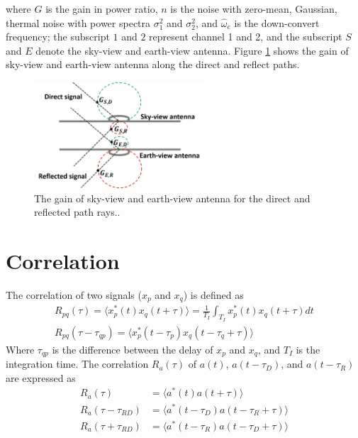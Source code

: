 \documentclass[draftcls]{IEEEtran}
\begin{document}
where $G$ is the gain in power ratio, $n$ is the noise with zero-mean, Gaussian, thermal noise with power spectra $\sigma^2_1$ and $\sigma^2_2$, and $\hat{\omega}_e$ is the down-convert frequency; the subscript $1$ and $2$ represent channel 1 and 2, and the subscript $S$ and $E$ denote the sky-view and earth-view antenna. Figure \ref{fig:ant_gain} shows the gain of sky-view and earth-view antenna along the direct and reflect paths.
\begin{figure}[t!]
	\centering
	\includegraphics[width=2.5in]{pdf/ant_gain.jpg}
	\caption{The gain of sky-view and earth-view antenna for the direct and reflected path rays..}
	\centering
	\label{fig:ant_gain}
\end{figure}

\section{Correlation}

The correlation of two signals ($x_p$ and $x_q$) is defined as
\begin{eqnarray}
	R_{pq}(\tau)  = \langle x_p^*(t)x_q(t+\tau)\rangle=\frac{1}{T_I} \int_{T_I}x_p^*(t) x_q(t+\tau)dt \\ 
    R_{pq}(\tau-\tau_{qp}) =\langle x_p^*(t-\tau_p)x_q(t-\tau_q +\tau)\rangle
    \label{Eq: correlation_def}
\end{eqnarray}
Where $\tau_{qp}$ is the difference between the delay of $x_p$ and $x_q$, and $T_I$ is the integration time. The correlation $R_a(\tau)$ of $a(t)$, $a(t-\tau_D)$, and $a(t-\tau_R)$ are expressed as
\begin{equation}
\begin{split}
	R_a(\tau)&=\langle a^*(t)a(t +\tau)\rangle \\
    R_a(\tau-\tau_{RD})&=\langle a^*(t-\tau_D)a(t -\tau_R+\tau)\rangle \\
    R_a(\tau+\tau_{RD})&=\langle a^*(t-\tau_R)a(t -\tau_D+\tau)\rangle \\
 \end{split}
\end{equation}
\end{document}
